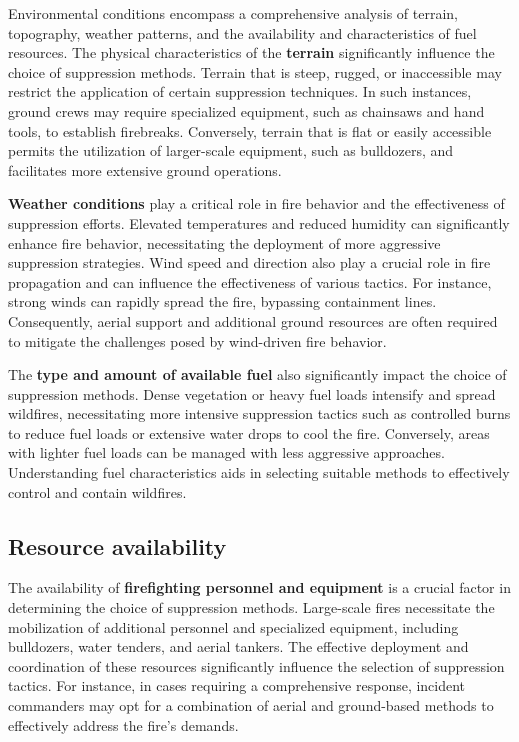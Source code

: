 \documentclass[
  12 pt,
]{Nemilov}
\begin{document}
Environmental conditions encompass a comprehensive analysis of terrain, topography, weather patterns, and the availability and characteristics of fuel resources. The physical characteristics of the \textbf{terrain} significantly influence the choice of suppression methods. Terrain that is steep, rugged, or inaccessible may restrict the application of certain suppression techniques. In such instances, ground crews may require specialized equipment, such as chainsaws and hand tools, to establish firebreaks. Conversely, terrain that is flat or easily accessible permits the utilization of larger-scale equipment, such as bulldozers, and facilitates more extensive ground operations.

\textbf{Weather conditions} play a critical role in fire behavior and the effectiveness of suppression efforts. Elevated temperatures and reduced humidity can significantly enhance fire behavior, necessitating the deployment of more aggressive suppression strategies. Wind speed and direction also play a crucial role in fire propagation and can influence the effectiveness of various tactics. For instance, strong winds can rapidly spread the fire, bypassing containment lines. Consequently, aerial support and additional ground resources are often required to mitigate the challenges posed by wind-driven fire behavior.

The \textbf{type and amount of available fuel} also significantly impact the choice of suppression methods. Dense vegetation or heavy fuel loads intensify and spread wildfires, necessitating more intensive suppression tactics such as controlled burns to reduce fuel loads or extensive water drops to cool the fire. Conversely, areas with lighter fuel loads can be managed with less aggressive approaches. Understanding fuel characteristics aids in selecting suitable methods to effectively control and contain wildfires.

\subsection{Resource availability}\label{resource-availability}

The availability of \textbf{firefighting personnel and equipment} is a crucial factor in determining the choice of suppression methods. Large-scale fires necessitate the mobilization of additional personnel and specialized equipment, including bulldozers, water tenders, and aerial tankers. The effective deployment and coordination of these resources significantly influence the selection of suppression tactics. For instance, in cases requiring a comprehensive response, incident commanders may opt for a combination of aerial and ground-based methods to effectively address the fire's demands.
\end{document}
